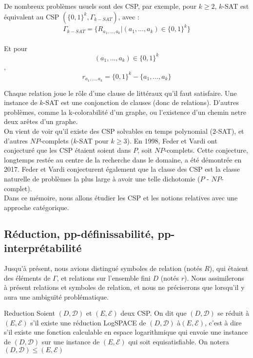 De nombreux problèmes usuels sont des CSP, par exemple, pour $k \geq 2$, $k$-SAT est équivalent au CSP $(\{0,1\}^k,\Gamma_{k-SAT})$, avec :\\

$$\Gamma_{k-SAT} = \{R_{a_1,\dots,a_k}|(a_1,\dots,a_k) \in \{0,1\}^k\}$$\\ Et pour $$(a_1,\dots,a_k) \in \{0,1\}^k$$, $$r_{a_1,\dots,a_k} = \{0,1\}^k - \{a_1,\dots,a_k\} $$

Chaque relation joue le rôle d'une clause de littéraux qu'il faut satisfaire. Une instance de $k$-SAT est une conjonction de clauses (donc de relations). D'autres problèmes, comme la k-colorabilité d'un graphe, ou l'existence d'un chemin netre deux arêtes d'un graphe.\\

On vient de voir qu'il existe des CSP solvables en temps polynomial ($2$-SAT), et d'autres $NP$-complets ($k$-SAT pour $k \geq 3$). En 1998, Feder et Vardi ont conjecturé que les CSP étaient soient dans $P$, soit $NP$-complets. Cette conjecture, longtemps restée au centre de la recherche dans le domaine, a été démontrée en 2017. Feder et Vardi conjecturent également que la classe des CSP est la classe naturelle de problèmes la plus large à avoir une telle dichotomie ($P$ - $NP$-complet).\\
Dans ce mémoire, nous allons étudier les CSP et les notions relatives avec une approche catégorique.\\

\subsection{Réduction, pp-définissabilité, pp-interprétabilité}

Jusqu'à présent, nous avions distingué symboles de relation (notés $R$), qui étaient des éléments de $\Gamma$, et relations sur l'ensemble fini $D$ (notés $r$). Nous assimilerons à présent relations et symboles de relation, et nous ne préciserons que lorsqu'il y aura une ambiguïté problématique.

\begin{defi}{Reduction}
Soient $(D,\mathcal{D})$ et $(E,\mathcal{E})$ deux CSP. On dit que $(D,\mathcal{D})$ se réduit à  $(E,\mathcal{E})$ s'il existe une réduction LogSPACE de $(D,\mathcal{D})$ à$(E,\mathcal{E})$, c'est à dire s'il existe une fonction calculable en espace logarithmique qui envoie une instance de $(D,\mathcal{D})$ sur une instance de $(E,\mathcal{E})$ qui soit equisatisfiable. On notera $(D,\mathcal{D}) \leq (E,\mathcal{E})$
\end{defi}

